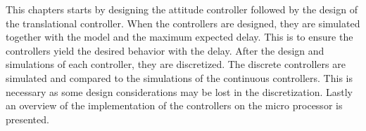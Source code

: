 
This chapters starts by designing the attitude controller followed by the design of the translational controller. When the controllers are designed, they are simulated together with the model and the maximum expected delay. This is to ensure the controllers yield the desired behavior with the delay. After the design and simulations of each controller, they are discretized. The discrete controllers are simulated and compared to the simulations of the continuous controllers. This is necessary as some design considerations may be lost in the discretization. Lastly an overview of the implementation of the controllers on the micro processor is presented. 

